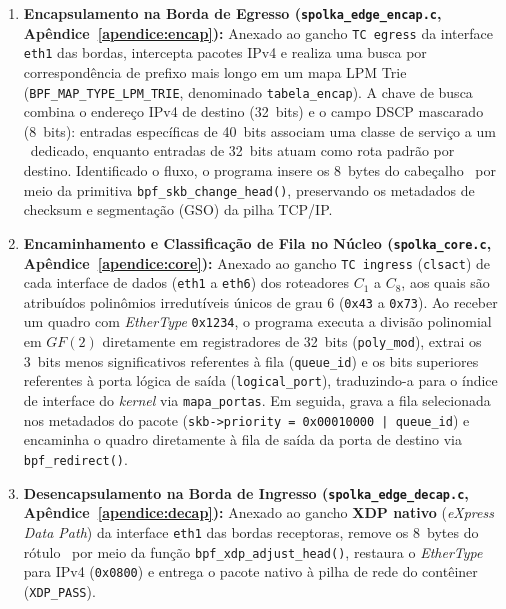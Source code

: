 \begin{enumerate}
    \item \textbf{Encapsulamento na Borda de Egresso (\texttt{spolka\_edge\_encap.c}, Apêndice~\ref{apendice:encap}):} Anexado ao gancho \texttt{TC egress} da interface \texttt{eth1} das bordas, intercepta pacotes IPv4 e realiza uma busca por correspondência de prefixo mais longo em um mapa LPM Trie (\texttt{BPF\_MAP\_TYPE\_LPM\_TRIE}, denominado \texttt{tabela\_encap}). A chave de busca combina o endereço IPv4 de destino (32~bits) e o campo DSCP mascarado (8~bits): entradas específicas de 40~bits associam uma classe de serviço a um \routeID\ dedicado, enquanto entradas de 32~bits atuam como rota padrão por destino. Identificado o fluxo, o programa insere os 8~bytes do cabeçalho \nome\ por meio da primitiva \texttt{bpf\_skb\_change\_head()}, preservando os metadados de checksum e segmentação (GSO) da pilha TCP/IP.
    \item \textbf{Encaminhamento e Classificação de Fila no Núcleo (\texttt{spolka\_core.c}, Apêndice~\ref{apendice:core}):} Anexado ao gancho \texttt{TC ingress} (\texttt{clsact}) de cada interface de dados (\texttt{eth1} a \texttt{eth6}) dos roteadores $C_1$ a $C_8$, aos quais são atribuídos polinômios irredutíveis únicos de grau 6 (\texttt{0x43} a \texttt{0x73}). Ao receber um quadro com \textit{EtherType} \texttt{0x1234}, o programa executa a divisão polinomial em $GF(2)$ diretamente em registradores de 32~bits (\texttt{poly\_mod}), extrai os 3~bits menos significativos referentes à fila (\texttt{queue\_id}) e os bits superiores referentes à porta lógica de saída (\texttt{logical\_port}), traduzindo-a para o índice de interface do \textit{kernel} via \texttt{mapa\_portas}. Em seguida, grava a fila selecionada nos metadados do pacote (\texttt{skb->priority = 0x00010000 | queue\_id}) e encaminha o quadro diretamente à fila de saída da porta de destino via \texttt{bpf\_redirect()}.
    \item \textbf{Desencapsulamento na Borda de Ingresso (\texttt{spolka\_edge\_decap.c}, Apêndice~\ref{apendice:decap}):} Anexado ao gancho \textbf{XDP nativo} (\textit{eXpress Data Path}) da interface \texttt{eth1} das bordas receptoras, remove os 8~bytes do rótulo \nome\ por meio da função \texttt{bpf\_xdp\_adjust\_head()}, restaura o \textit{EtherType} para IPv4 (\texttt{0x0800}) e entrega o pacote nativo à pilha de rede do contêiner (\texttt{XDP\_PASS}).
\end{enumerate}

